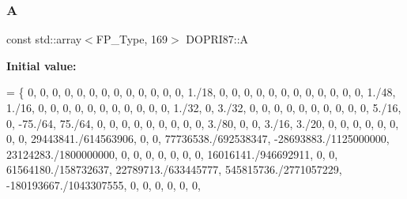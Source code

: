 \subsubsection{\texorpdfstring{A}{A}}
{\footnotesize\ttfamily const std\+::array$<$F\+P\+\_\+\+Type, 169$>$ D\+O\+P\+R\+I87\+::A}

{\bfseries Initial value\+:}
\begin{DoxyCode}
= \{
    0,                       0,      0,        0,                          0,                       0,     
                          0,                         0,                         0,                         0,     
                        0,                      0,  0,
    1./18,                   0,      0,        0,                          0,                       0,     
                          0,                         0,                         0,                         0,     
                        0,                      0,  0,
    1./48,                   1./16,  0,        0,                          0,                       0,     
                          0,                         0,                         0,                         0,     
                        0,                      0,  0,
    1./32,                   0,      3./32,    0,                          0,                       0,     
                          0,                         0,                         0,                         0,     
                        0,                      0,  0,
    5./16,                   0,      -75./64,  75./64,                     0,                       0,     
                          0,                         0,                         0,                         0,     
                        0,                      0,  0,
    3./80,                   0,      0,        3./16,                      3./20,                   0,     
                          0,                         0,                         0,                         0,     
                        0,                      0,  0,
    29443841./614563906,     0,      0,        77736538./692538347,        -28693883./1125000000,   
      23124283./1800000000,      0,                         0,                         0,                         0,     
                        0,                      0,  0,
    16016141./946692911,     0,      0,        61564180./158732637,        22789713./633445777,     
      545815736./2771057229,     -180193667./1043307555,    0,                         0,                         0,     
                        0,                      0,  0,

\end{DoxyCode}

